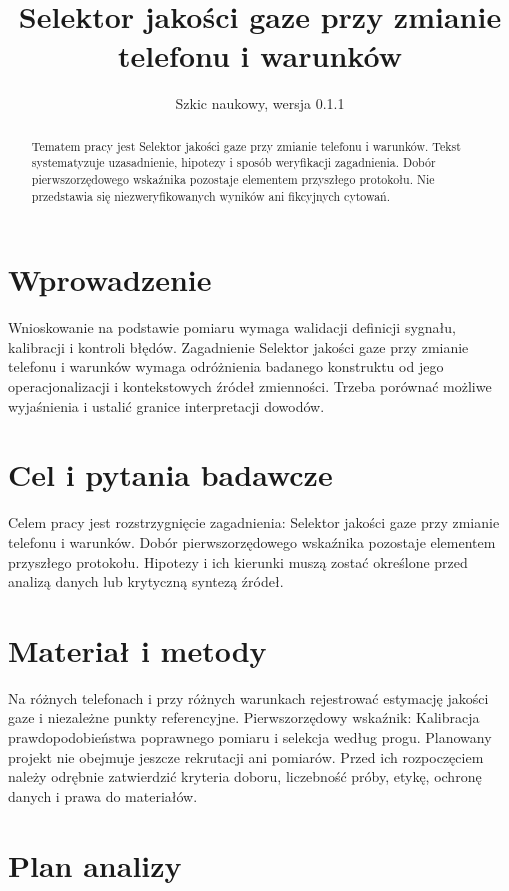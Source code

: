 \documentclass[11pt,a4paper]{article}
\title{Selektor jakości gaze przy zmianie telefonu i warunków}
\author{}
\date{Szkic naukowy, wersja 0.1.1}
\begin{document}
\maketitle

\begin{abstract}

Tematem pracy jest Selektor jakości gaze przy zmianie telefonu i warunków. Tekst systematyzuje uzasadnienie, hipotezy i sposób weryfikacji zagadnienia. Dobór pierwszorzędowego wskaźnika pozostaje elementem przyszłego protokołu. Nie przedstawia się niezweryfikowanych wyników ani fikcyjnych cytowań.

\end{abstract}

\section{Wprowadzenie}

Wnioskowanie na podstawie pomiaru wymaga walidacji definicji sygnału, kalibracji i kontroli błędów. Zagadnienie Selektor jakości gaze przy zmianie telefonu i warunków wymaga odróżnienia badanego konstruktu od jego operacjonalizacji i kontekstowych źródeł zmienności. Trzeba porównać możliwe wyjaśnienia i ustalić granice interpretacji dowodów.

\section{Cel i pytania badawcze}

Celem pracy jest rozstrzygnięcie zagadnienia: Selektor jakości gaze przy zmianie telefonu i warunków. Dobór pierwszorzędowego wskaźnika pozostaje elementem przyszłego protokołu. Hipotezy i ich kierunki muszą zostać określone przed analizą danych lub krytyczną syntezą źródeł.

\section{Materiał i metody}

Na różnych telefonach i przy różnych warunkach rejestrować estymację jakości gaze i niezależne punkty referencyjne. Pierwszorzędowy wskaźnik: Kalibracja prawdopodobieństwa poprawnego pomiaru i selekcja według progu. Planowany projekt nie obejmuje jeszcze rekrutacji ani pomiarów. Przed ich rozpoczęciem należy odrębnie zatwierdzić kryteria doboru, liczebność próby, etykę, ochronę danych i prawa do materiałów.

\section{Plan analizy}
\end{document}
